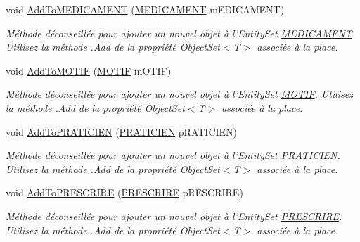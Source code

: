 \begin{DoxyCompactItemize}
void \hyperlink{class_model_1_1_b_d_d___s_i_o7_entities_a612c8d919e09d81c47301d83e153e684}{Add\-To\-M\-E\-D\-I\-C\-A\-M\-E\-N\-T} (\hyperlink{class_model_1_1_m_e_d_i_c_a_m_e_n_t}{M\-E\-D\-I\-C\-A\-M\-E\-N\-T} m\-E\-D\-I\-C\-A\-M\-E\-N\-T)
\begin{DoxyCompactList}\small\item\em Méthode déconseillée pour ajouter un nouvel objet à l'Entity\-Set \hyperlink{class_model_1_1_m_e_d_i_c_a_m_e_n_t}{M\-E\-D\-I\-C\-A\-M\-E\-N\-T}. Utilisez la méthode .Add de la propriété Object\-Set$<$T$>$ associée à la place. \end{DoxyCompactList}\item 
void \hyperlink{class_model_1_1_b_d_d___s_i_o7_entities_a094dc07ad708a675e828b33fc869fda5}{Add\-To\-M\-O\-T\-I\-F} (\hyperlink{class_model_1_1_m_o_t_i_f}{M\-O\-T\-I\-F} m\-O\-T\-I\-F)
\begin{DoxyCompactList}\small\item\em Méthode déconseillée pour ajouter un nouvel objet à l'Entity\-Set \hyperlink{class_model_1_1_m_o_t_i_f}{M\-O\-T\-I\-F}. Utilisez la méthode .Add de la propriété Object\-Set$<$T$>$ associée à la place. \end{DoxyCompactList}\item 
void \hyperlink{class_model_1_1_b_d_d___s_i_o7_entities_a7e4687bf54919ebb25e95f2b0c1ee5cd}{Add\-To\-P\-R\-A\-T\-I\-C\-I\-E\-N} (\hyperlink{class_model_1_1_p_r_a_t_i_c_i_e_n}{P\-R\-A\-T\-I\-C\-I\-E\-N} p\-R\-A\-T\-I\-C\-I\-E\-N)
\begin{DoxyCompactList}\small\item\em Méthode déconseillée pour ajouter un nouvel objet à l'Entity\-Set \hyperlink{class_model_1_1_p_r_a_t_i_c_i_e_n}{P\-R\-A\-T\-I\-C\-I\-E\-N}. Utilisez la méthode .Add de la propriété Object\-Set$<$T$>$ associée à la place. \end{DoxyCompactList}\item 
void \hyperlink{class_model_1_1_b_d_d___s_i_o7_entities_accc4001cadd40aa0e911ee9e01b534bf}{Add\-To\-P\-R\-E\-S\-C\-R\-I\-R\-E} (\hyperlink{class_model_1_1_p_r_e_s_c_r_i_r_e}{P\-R\-E\-S\-C\-R\-I\-R\-E} p\-R\-E\-S\-C\-R\-I\-R\-E)
\begin{DoxyCompactList}\small\item\em Méthode déconseillée pour ajouter un nouvel objet à l'Entity\-Set \hyperlink{class_model_1_1_p_r_e_s_c_r_i_r_e}{P\-R\-E\-S\-C\-R\-I\-R\-E}. Utilisez la méthode .Add de la propriété Object\-Set$<$T$>$ associée à la place. \end{DoxyCompactList}\item 

\end{DoxyCompactItemize}

